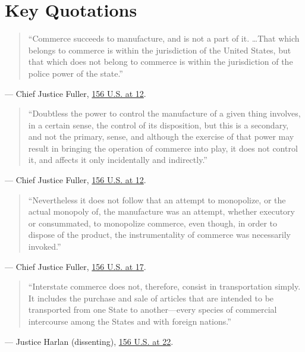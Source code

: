 \documentclass[12pt]{article}
\begin{document}
\section{Key Quotations}
\begin{quote}
``Commerce succeeds to manufacture, and is not a part of it. \ldots That which belongs to commerce is within the jurisdiction of the United States, but that which does not belong to commerce is within the jurisdiction of the police power of the state.''
\end{quote}
\noindent --- Chief Justice Fuller, \href{https://supreme.justia.com/cases/federal/us/156/1/}{156 U.S. at 12}.

\begin{quote}
``Doubtless the power to control the manufacture of a given thing involves, in a certain sense, the control of its disposition, but this is a secondary, and not the primary, sense, and although the exercise of that power may result in bringing the operation of commerce into play, it does not control it, and affects it only incidentally and indirectly.''
\end{quote}
\noindent --- Chief Justice Fuller, \href{https://supreme.justia.com/cases/federal/us/156/1/}{156 U.S. at 12}.

\begin{quote}
``Nevertheless it does not follow that an attempt to monopolize, or the actual monopoly of, the manufacture was an attempt, whether executory or consummated, to monopolize commerce, even though, in order to dispose of the product, the instrumentality of commerce was necessarily invoked.''
\end{quote}
\noindent --- Chief Justice Fuller, \href{https://supreme.justia.com/cases/federal/us/156/1/}{156 U.S. at 17}.

\begin{quote}
``Interstate commerce does not, therefore, consist in transportation simply. It includes the purchase and sale of articles that are intended to be transported from one State to another---every species of commercial intercourse among the States and with foreign nations.''
\end{quote}
\noindent --- Justice Harlan (dissenting), \href{https://www.law.cornell.edu/constitution-conan/article-1/section-8/clause-3/commerce-among-the-several-states}{156 U.S. at 22}.
\end{document}
